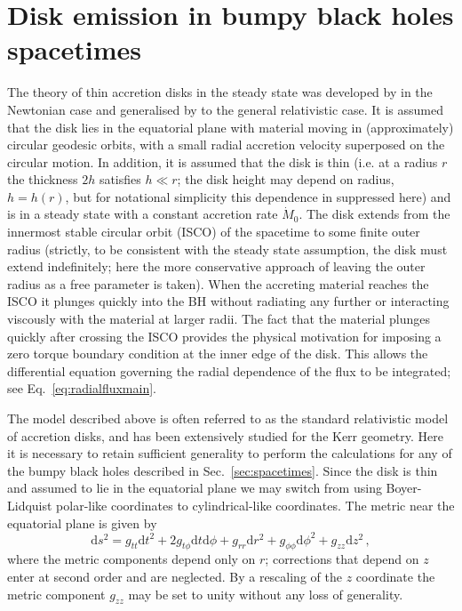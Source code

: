 \section{Disk emission in bumpy black holes spacetimes}\label{sec:emission}
The theory of thin accretion disks in the steady state was developed by \cite{1973A&A....24..337S} in the Newtonian case and generalised by \cite{1974ApJ...191..499P} to the general relativistic case. It is assumed that the disk lies in the equatorial plane with material moving in (approximately) circular geodesic orbits, with a small radial accretion velocity superposed on the circular motion. In addition, it is assumed that the disk is thin (i.e. at a radius $r$ the thickness $2h$ satisfies $h\ll r$; the disk height may depend on radius, $h=h(r)$, but for notational simplicity this dependence in suppressed here) and is in a steady state with a constant accretion rate $\dot{M}_{0}$. The disk extends from the innermost stable circular orbit (ISCO) of the spacetime to some finite outer radius (strictly, to be consistent with the steady state assumption, the disk must extend indefinitely; here the more conservative approach of leaving the outer radius as a free parameter is taken). When the accreting material reaches the ISCO it plunges quickly into the BH without radiating any further or interacting viscously with the material at larger radii. The fact that the material plunges quickly after crossing the ISCO provides the physical motivation for imposing a zero torque boundary condition at the inner edge of the disk. This allows the differential equation governing the radial dependence of the flux to be integrated; see Eq.\ \ref{eq:radialfluxmain}. 

The model described above is often referred to as the standard relativistic model of accretion disks, and has been extensively studied for the Kerr geometry. Here it is necessary to retain sufficient generality to perform the calculations for any of the bumpy black holes described in Sec.\ \ref{sec:spacetimes}. Since the disk is thin and assumed to lie in the equatorial plane we may switch from using Boyer-Lidquist polar-like coordinates to cylindrical-like coordinates. The metric near the equatorial plane is given by
\begin{equation}\label{eq:metriccylindrical} \textrm{d}s^{2} = g_{tt}\textrm{d}t^{2}+2g_{t\phi}\textrm{d}t\textrm{d}\phi +g_{rr}\textrm{d}r^{2} + g_{\phi\phi}\textrm{d}\phi ^{2} + g_{zz} \textrm{d}z^{2}\, , \end{equation}
where the metric components depend only on $r$; corrections that depend on $z$ enter at second order and are neglected. By a rescaling of the $z$ coordinate the metric component $g_{zz}$ may be set to unity without any loss of generality.

